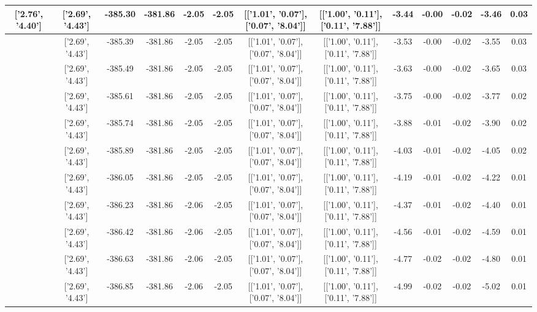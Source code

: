 \begin{table}[htbp]
\begin{adjustbox}{angle=90}
\begin{tabular}{|c|c|c|c|c|c|c|c|c|c|c|c|c|}
 ['2.76', '4.40'] & ['2.69', '4.43'] & -385.30 & -381.86 & -2.05 & -2.05 & [['1.01', '0.07'], ['0.07', '8.04']] & [['1.00', '0.11'], ['0.11', '7.88']] & -3.44 & -0.00 & -0.02 & -3.46 & 0.03\\ \hline
 ['2.77', '4.39'] & ['2.69', '4.43'] & -385.39 & -381.86 & -2.05 & -2.05 & [['1.01', '0.07'], ['0.07', '8.04']] & [['1.00', '0.11'], ['0.11', '7.88']] & -3.53 & -0.00 & -0.02 & -3.55 & 0.03\\ \hline
 ['2.78', '4.39'] & ['2.69', '4.43'] & -385.49 & -381.86 & -2.05 & -2.05 & [['1.01', '0.07'], ['0.07', '8.04']] & [['1.00', '0.11'], ['0.11', '7.88']] & -3.63 & -0.00 & -0.02 & -3.65 & 0.03\\ \hline
 ['2.80', '4.38'] & ['2.69', '4.43'] & -385.61 & -381.86 & -2.05 & -2.05 & [['1.01', '0.07'], ['0.07', '8.04']] & [['1.00', '0.11'], ['0.11', '7.88']] & -3.75 & -0.00 & -0.02 & -3.77 & 0.02\\ \hline
 ['2.81', '4.38'] & ['2.69', '4.43'] & -385.74 & -381.86 & -2.05 & -2.05 & [['1.01', '0.07'], ['0.07', '8.04']] & [['1.00', '0.11'], ['0.11', '7.88']] & -3.88 & -0.01 & -0.02 & -3.90 & 0.02\\ \hline
 ['2.82', '4.37'] & ['2.69', '4.43'] & -385.89 & -381.86 & -2.05 & -2.05 & [['1.01', '0.07'], ['0.07', '8.04']] & [['1.00', '0.11'], ['0.11', '7.88']] & -4.03 & -0.01 & -0.02 & -4.05 & 0.02\\ \hline
 ['2.83', '4.36'] & ['2.69', '4.43'] & -386.05 & -381.86 & -2.05 & -2.05 & [['1.01', '0.07'], ['0.07', '8.04']] & [['1.00', '0.11'], ['0.11', '7.88']] & -4.19 & -0.01 & -0.02 & -4.22 & 0.01\\ \hline
 ['2.85', '4.36'] & ['2.69', '4.43'] & -386.23 & -381.86 & -2.06 & -2.05 & [['1.01', '0.07'], ['0.07', '8.04']] & [['1.00', '0.11'], ['0.11', '7.88']] & -4.37 & -0.01 & -0.02 & -4.40 & 0.01\\ \hline
 ['2.86', '4.35'] & ['2.69', '4.43'] & -386.42 & -381.86 & -2.06 & -2.05 & [['1.01', '0.07'], ['0.07', '8.04']] & [['1.00', '0.11'], ['0.11', '7.88']] & -4.56 & -0.01 & -0.02 & -4.59 & 0.01\\ \hline
 ['2.87', '4.34'] & ['2.69', '4.43'] & -386.63 & -381.86 & -2.06 & -2.05 & [['1.01', '0.07'], ['0.07', '8.04']] & [['1.00', '0.11'], ['0.11', '7.88']] & -4.77 & -0.02 & -0.02 & -4.80 & 0.01\\ \hline
 ['2.89', '4.34'] & ['2.69', '4.43'] & -386.85 & -381.86 & -2.06 & -2.05 & [['1.01', '0.07'], ['0.07', '8.04']] & [['1.00', '0.11'], ['0.11', '7.88']] & -4.99 & -0.02 & -0.02 & -5.02 & 0.01\\ \hline

\end{tabular}
\end{adjustbox}
\end{table}
